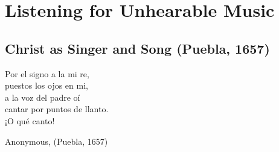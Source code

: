 
% 
% 


\part{Listening for Unhearable Music}
\label{part:unhearable-music}

\chapter[Christ as Singer and Song]
{Christ as Singer and Song (Puebla, 1657)}
\label{ch:padilla-voces}

\epigraph
{Por el signo a la mi re, \\ 
puestos los ojos en mi, \\
a la voz del padre oí \\
cantar por puntos de llanto. \\
¡O qué canto!}
{Anonymous,  (Puebla, 1657)}

